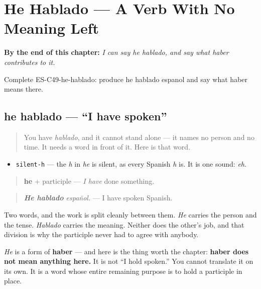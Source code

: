 
\chapter{He Hablado --- A Verb With No Meaning Left}
\label{ch:perfect-first-person}

\begin{chapteropening}
\textbf{By the end of this chapter:} \emph{I can say he hablado, and say what haber contributes to it.}

Complete ES-C49-he-hablado: produce he hablado espanol and say what haber means there.
\end{chapteropening}

\section[he hablado]{he hablado — \textquotedblleft{}I have spoken\textquotedblright{}}

\label{lesson:ES-C49-he-hablado}



\begin{quote}
You have \emph{hablado}, and it cannot stand alone — it names no person and no time. It needs a word in front of it. Here is that word.
\end{quote}

\begin{sounds}
\begin{itemize}
\raggedright
  \item \texttt{silent-h} — the \emph{h} in \emph{he} is silent, as every Spanish \emph{h} is. It is one sound: \emph{eh}.
\end{itemize}
\end{sounds}

\begin{grammarlens}[title={Grammar Lens: the emptied verb}]
\begin{quote}
\textbf{he} + participle — \emph{I have} done something.
\end{quote}

\begin{quote}
\emph{\textbf{He hablado} español.} — I have spoken Spanish.
\end{quote}

Two words, and the work is split cleanly between them. \emph{He} carries the person and the tense. \emph{Hablado} carries the meaning. Neither does the other's job, and that division is why the participle never had to agree with anybody.

\emph{He} is a form of \textbf{haber} — and here is the thing worth the chapter: \textbf{haber does not mean anything here.} It is not \textquotedblleft{}I hold spoken.\textquotedblright{} You cannot translate it on its own. It is a word whose entire remaining purpose is to hold a participle in place.
\end{grammarlens}

